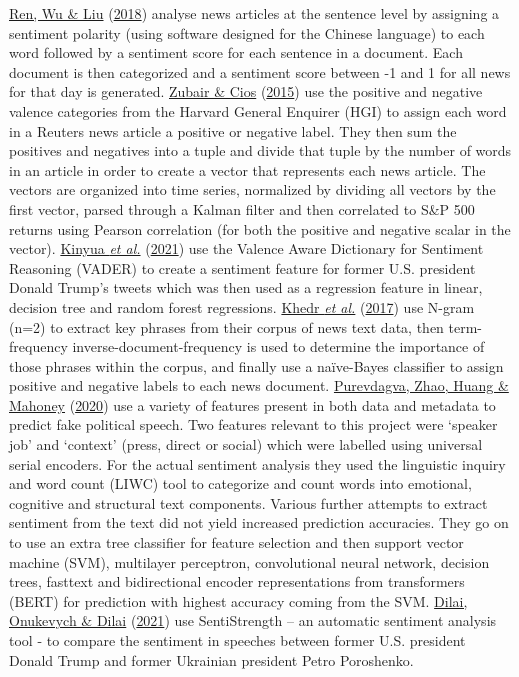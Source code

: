 \documentclass[11pt,preprint, authoryear]{elsarticle}
\numberwithin{equation}{section}
\numberwithin{figure}{section}
\numberwithin{table}{section}
\begin{document}
\protect\hyperlink{ref-ren2018forecasting}{Ren, Wu \& Liu}
(\protect\hyperlink{ref-ren2018forecasting}{2018}) analyse news articles
at the sentence level by assigning a sentiment polarity (using software
designed for the Chinese language) to each word followed by a sentiment
score for each sentence in a document. Each document is then categorized
and a sentiment score between -1 and 1 for all news for that day is
generated. \protect\hyperlink{ref-zubair2015extracting}{Zubair \& Cios}
(\protect\hyperlink{ref-zubair2015extracting}{2015}) use the positive
and negative valence categories from the Harvard General Enquirer (HGI)
to assign each word in a Reuters news article a positive or negative
label. They then sum the positives and negatives into a tuple and divide
that tuple by the number of words in an article in order to create a
vector that represents each news article. The vectors are organized into
time series, normalized by dividing all vectors by the first vector,
parsed through a Kalman filter and then correlated to S\&P 500 returns
using Pearson correlation (for both the positive and negative scalar in
the vector). \protect\hyperlink{ref-kinyua2021analysis}{Kinyua \emph{et
al.}} (\protect\hyperlink{ref-kinyua2021analysis}{2021}) use the Valence
Aware Dictionary for Sentiment Reasoning (VADER) to create a sentiment
feature for former U.S. president Donald Trump's tweets which was then
used as a regression feature in linear, decision tree and random forest
regressions. \protect\hyperlink{ref-khedr2017predicting}{Khedr \emph{et
al.}} (\protect\hyperlink{ref-khedr2017predicting}{2017}) use N-gram
(n=2) to extract key phrases from their corpus of news text data, then
term-frequency inverse-document-frequency is used to determine the
importance of those phrases within the corpus, and finally use a
naïve-Bayes classifier to assign positive and negative labels to each
news document. \protect\hyperlink{ref-purevdagva2020machine}{Purevdagva,
Zhao, Huang \& Mahoney}
(\protect\hyperlink{ref-purevdagva2020machine}{2020}) use a variety of
features present in both data and metadata to predict fake political
speech. Two features relevant to this project were `speaker job' and
`context' (press, direct or social) which were labelled using universal
serial encoders. For the actual sentiment analysis they used the
linguistic inquiry and word count (LIWC) tool to categorize and count
words into emotional, cognitive and structural text components. Various
further attempts to extract sentiment from the text did not yield
increased prediction accuracies. They go on to use an extra tree
classifier for feature selection and then support vector machine (SVM),
multilayer perceptron, convolutional neural network, decision trees,
fasttext and bidirectional encoder representations from transformers
(BERT) for prediction with highest accuracy coming from the SVM.
\protect\hyperlink{ref-dilaisentiment}{Dilai, Onukevych \& Dilai}
(\protect\hyperlink{ref-dilaisentiment}{2021}) use SentiStrength -- an
automatic sentiment analysis tool - to compare the sentiment in speeches
between former U.S. president Donald Trump and former Ukrainian
president Petro Poroshenko.
\end{document}
